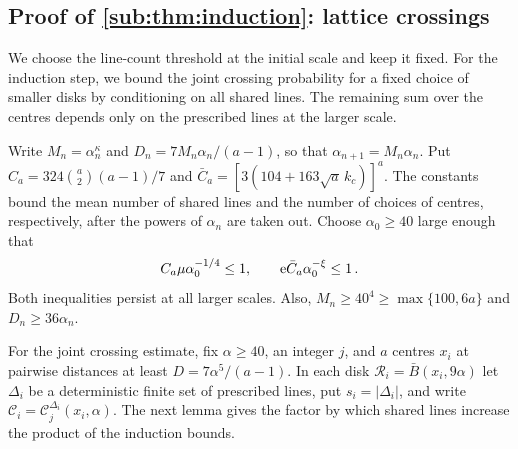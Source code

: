 \documentclass[11pt,letterpaper]{article}
\newcommand{\cC}{\mathcal C}
\begin{document}
\subsection{Proof of \texorpdfstring{\cref{sub:thm:induction}}{the multiscale bound}: lattice crossings}
\label{sub:sec:induction}

We choose the line-count threshold at the initial scale and keep it fixed. For the induction step, we bound the joint crossing probability for a fixed choice of smaller disks by conditioning on all shared lines. The remaining sum over the centres depends only on the prescribed lines at the larger scale.

Write $M_n=\alpha_n^\kappa$ and $D_n=7M_n\alpha_n/(a-1)$, so that $\alpha_{n+1}=M_n\alpha_n$. Put
$C_a=324\binom a2(a-1)/7$ and $\bar C_a=[3(104+163\sqrt a\,k_c)]^a$.
The constants bound the mean number of shared lines and the number of choices of centres, respectively, after the powers of $\alpha_n$ are taken out. Choose $\alpha_0\ge40$ large enough that
\begin{equation}\label{sub:eq:A3}
   C_a\mu\alpha_0^{-1/4}\le1,\qquad \mathrm{e} \bar C_a\alpha_0^{-\xi}\le1\,.
\end{equation}
Both inequalities persist at all larger scales. Also, $M_n\ge40^4\ge\max\{100,6a\}$ and $D_n\ge36\alpha_n$.

For the joint crossing estimate, fix $\alpha\ge40$, an integer $j$, and $a$ centres $x_i$ at pairwise distances at least $D=7\alpha^5/(a-1)$. In each disk $\mathcal R_i=\bar B(x_i,9\alpha)$ let $\Delta_i$ be a deterministic finite set of prescribed lines, put $s_i=\lvert\Delta_i\rvert$, and write $\cC_i=\cC_j^{\Delta_i}(x_i,\alpha)$. The next lemma gives the factor by which shared lines increase the product of the induction bounds.

\end{document}
